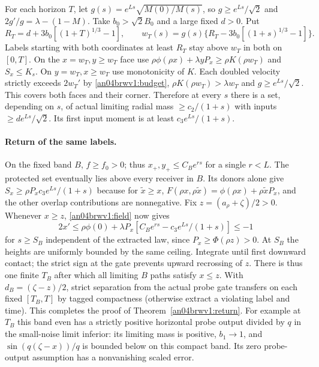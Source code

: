 \documentclass[11pt]{article}
\begin{document}
For each horizon $T$, let $g(s)=e^{Ls}\sqrt{M(0)/M(s)}$, so
$g\ge e^{Ls}/\sqrt2$ and $2g'/g=\lambda-(1-M)$.
Take $b_0> \sqrt2 B_0$ and a large fixed $d>0$. Put
\[
 R_T=d+3b_0[(1+T)^{1/3}-1],\qquad
 w_T(s)=g(s)\{R_T-3b_0[(1+s)^{1/3}-1]\}.
\]
Labels starting with both coordinates at least $R_T$ stay above
$w_T$ in both on $[0,T]$. On the $x=w_T,y\ge w_T$ face use
$\rho\phi(\rho x)+\lambda yP_x\ge\rho K(\rho w_T)$ and $S_x\le K_s$.
On $y=w_T,x\ge w_T$ use monotonicity of $K$. Each doubled velocity
strictly exceeds $2w_T'$ by \eqref{an04brwv1:budget},
$\rho K(\rho w_T)>\lambda w_T$ and $g\ge e^{Ls}/\sqrt2$.
This covers both faces and their corner. Therefore at every $s$ there
is a set, depending on $s$, of actual limiting radial mass
$\ge c_2/(1+s)$ with inputs $\ge d e^{Ls}/\sqrt2$.
Its first input moment is at least $c_3e^{Ls}/(1+s)$.

\paragraph{Return of the same labels.}
On the fixed band $B$, $f\ge f_0>0$; thus $x_+,y_+\le C_Be^{rs}$
for a single $r<L$. The protected set eventually lies above every
receiver in $B$. Its donors alone give
$S_x\ge\rho P_x c_3e^{Ls}/(1+s)$ because for $\tilde x\ge x$,
$F(\rho x,\rho\tilde x)=\phi(\rho x)+\rho\tilde xP_x$, and the
other overlap contributions are nonnegative. Fix $z=(a_\rho+\zeta)/2>0$.
Whenever $x\ge z$, \eqref{an04brwv1:field} now gives
\begin{equation}\label{an04brwv1:drift}
 2x'\le\rho\phi(0)+\lambda P_x[C_Be^{rs}-c_3 e^{Ls}/(1+s)]\le-1
\end{equation}
for $s\ge S_B$ independent of the extracted law, since
$P_x\ge\Phi(\rho z)>0$. At $S_B$ the heights are uniformly bounded
by the same ceiling. Integrate until first downward contact; the
strict sign at the gate prevents upward recrossing of $z$. There
is thus one finite $T_B$ after which all limiting $B$ paths satisfy
$x\le z$. With $d_B=(\zeta-z)/2$, strict separation from the actual
probe gate transfers on each fixed $[T_B,T]$ by tagged compactness
(otherwise extract a violating label and time). This completes the
proof of Theorem~\ref{an04brwv1:return}. For example at $T_B$ this
band even has a strictly positive horizontal probe output divided by
$q$ in the small-noise limit inferior: its limiting mass is positive,
$b_1\to1$, and $\sin(q(\zeta-x))/q$ is bounded below on this compact
band. Its zero probe-output assumption has a nonvanishing scaled error.
\end{document}
